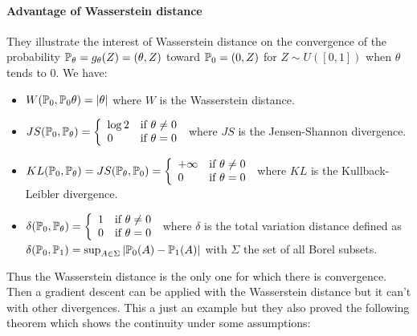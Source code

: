 \paragraph{Advantage of Wasserstein distance}
They illustrate the interest of Wasserstein distance on the convergence of the probability $\mathbb{P}_\theta = g_\theta(Z) = (\theta, Z)$ toward $\mathbb{P}_0 = (0, Z)$ for $Z \sim U([0, 1])$ when $\theta$ tends to 0. We have:
\begin{itemize}
	\item $W(\mathbb{P}_0, \mathbb{P}_0\theta) = | \theta |$ where $W$ is the Wasserstein distance.
	\item $JS(\mathbb{P}_0, \mathbb{P}_\theta) = \left\{ \begin{array}{ll}
			\log 2 & \text{if } \theta \neq 0 \\
			0 & \text{if } \theta = 0
		\end{array} \right.$ where $JS$ is the Jensen-Shannon divergence.
	\item $KL(\mathbb{P}_0, \mathbb{P}_\theta) = JS(\mathbb{P}_\theta, \mathbb{P}_0) = \left\{ \begin{array}{ll}
			+ \infty & \text{if } \theta \neq 0 \\
			0 & \text{if } \theta = 0
		\end{array} \right.$ where $KL$ is the Kullback-Leibler divergence.
	\item $\delta(\mathbb{P}_0, \mathbb{P}_\theta) = \left\{ \begin{array}{ll}
			1 & \text{if } \theta \neq 0 \\
			0 & \text{if } \theta = 0
		\end{array} \right.$ where $\delta$ is the total variation distance defined as $\delta(\mathbb{P}_0, \mathbb{P}_1) = \sup_{A \in \Sigma} | \mathbb{P}_0(A) - \mathbb{P}_1(A) |$ with $\Sigma$ the set of all Borel subsets.
\end{itemize}
Thus the Wasserstein distance is the only one for which there is convergence. Then a gradient descent can be applied with the Wasserstein distance but it can't with other divergences. This a just an example but they also proved the following theorem which shows the continuity under some assumptions:



